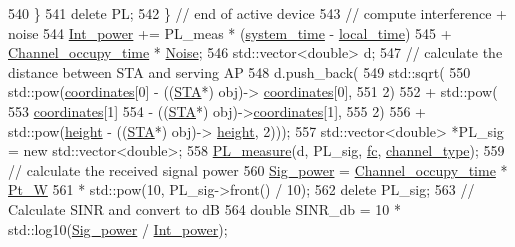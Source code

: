\begin{DoxyCode}
540             \}
541             \textcolor{keyword}{delete} PL;
542         \} \textcolor{comment}{// end of active device}
543           \textcolor{comment}{// compute interference + noise}
544         \hyperlink{classAP_a6c2c3e61c88d4bba7d949f5663b3ea10}{Int\_power} += PL\_meas * (\hyperlink{AP_8cpp_aaa03a568dc1d9d3391286ea24b9cfb63}{system\_time} - \hyperlink{classAP_ab31a52cd05ca5daf9ccd5d24941fe395}{local\_time})
545                 + \hyperlink{classAP_a2c168786c0400fa590bed7fabbca741e}{Channel\_occupy\_time} * \hyperlink{classAP_ae865c89ed6f1bace113d6ddb1a4f41d3}{Noise};
546         std::vector<double> d;
547         \textcolor{comment}{// calculate the distance between STA and serving AP}
548         d.push\_back(
549                 std::sqrt(
550                         std::pow(\hyperlink{classAP_ac52816d18c4dc26158fa3bd2e63f3bcc}{coordinates}[0] - ((\hyperlink{classSTA}{STA}*) obj)->
      \hyperlink{classAP_ac52816d18c4dc26158fa3bd2e63f3bcc}{coordinates}[0],
551                                 2)
552                                 + std::pow(
553                                         \hyperlink{classAP_ac52816d18c4dc26158fa3bd2e63f3bcc}{coordinates}[1]
554                                                 - ((\hyperlink{classSTA}{STA}*) obj)->\hyperlink{classAP_ac52816d18c4dc26158fa3bd2e63f3bcc}{coordinates}[1],
555                                         2)
556                                 + std::pow(\hyperlink{classAP_a27fec97f7b61e45d1350555cf62535d4}{height} - ((\hyperlink{classSTA}{STA}*) obj)->
      \hyperlink{classAP_a27fec97f7b61e45d1350555cf62535d4}{height}, 2)));
557         std::vector<double> *PL\_sig = \textcolor{keyword}{new} std::vector<double>;
558         \hyperlink{PL__measure_8cpp_afb433c5f099becf495d3c9d29ffc707d}{PL\_measure}(d, PL\_sig, \hyperlink{classAP_af7f928faaa72cbfe5c4f905cb146a564}{fc}, \hyperlink{classAP_a334f5b7be9725824797db57032de80e2}{channel\_type});
559         \textcolor{comment}{// calculate the received signal power}
560         \hyperlink{classAP_a39256449e3187dd7b8bdd1cfa0fbb2da}{Sig\_power} = \hyperlink{classAP_a2c168786c0400fa590bed7fabbca741e}{Channel\_occupy\_time} * \hyperlink{classAP_a10998008dbe6e924211af8d9ee155534}{Pt\_W}
561                 * std::pow(10, PL\_sig->front() / 10);
562         \textcolor{keyword}{delete} PL\_sig;
563         \textcolor{comment}{// Calculate SINR and convert to dB}
564         \textcolor{keywordtype}{double} SINR\_db = 10 * std::log10(\hyperlink{classAP_a39256449e3187dd7b8bdd1cfa0fbb2da}{Sig\_power} / \hyperlink{classAP_a6c2c3e61c88d4bba7d949f5663b3ea10}{Int\_power});

\end{DoxyCode}
